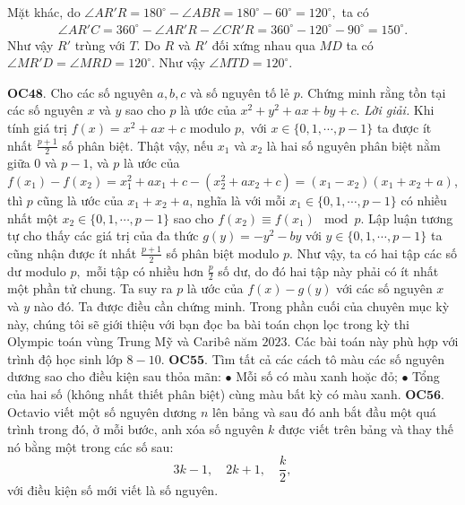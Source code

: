 \begin{multicols}
{	\vskip 0.1cm
	Mặt khác, do $\angle AR'R=180^\circ - \angle ABR= 180^\circ-60^\circ=120^\circ,$ ta có 
	\begin{align*}
		\angle AR'C=360^\circ-\angle AR'R - \angle CR'R = 360^\circ -120^\circ - 90^\circ=150^\circ.
	\end{align*}
	Như vậy $R'$ trùng với $T.$ Do $R$ và $R'$ đối xứng nhau qua $MD$ ta có $\angle MR'D=\angle MRD= 120^\circ.$  Như vậy $\angle MTD=120^\circ.$  
	
	
	{\bf\color{cackithi} OC$\pmb{48.}$} Cho các số nguyên $a, b, c$ và số nguyên tố lẻ $p.$ Chứng minh rằng tồn tại các số nguyên $x$ và $y$ sao cho $p$ là ước của $x^2 + y^2 + ax + by + c.$      
	\vskip 0.1cm
	\textit{Lời giải.}
	Khi tính giá trị  $f(x)=x^2+ax+c$ modulo $p,$ với $x \in \{0, 1, \cdots, p - 1\}$ ta được ít nhất $\frac{p+1}{2}$  số phân biệt. Thật vậy, nếu $x_1$ và $x_2$ là hai số nguyên phân biệt nằm giữa $0$ và $p-1$, và $p$ là ước của  $f(x_1)-f(x_2) = x_1^2 +ax_1+c-(x_2^2 +ax_2+c) = (x_1-x_2)(x_1+x_2+a)$,
	thì $p$ cũng là ước của $x_1 + x_2 + a$, nghĩa là với mỗi $x_1\in \{0, 1, \cdots, p - 1\}$ có nhiều nhất
	một $x_2\in \{0, 1, \cdots, p - 1\}$  sao cho $f(x_2)\equiv f(x_1) \mod p.$ 
	\vskip 0.1cm
	Lập luận tương tự cho thấy các giá trị của đa thức $g(y) = -y^2 - by$ với  $y \in \{0, 1, \cdots, p - 1\}$ ta cũng nhận được ít nhất $\frac{p+1}{2}$ số phân biệt modulo $p.$ Như vậy, ta có hai tập các số dư modulo $p,$  mỗi tập có nhiều hơn $\frac{p}{2}$ số dư, do đó hai tập này phải có ít nhất một phần tử chung. Ta suy ra $p$ là ước của $f(x) - g(y)$ với các số nguyên $x$ và $y$ nào đó. Ta được điều cần chứng minh.  
	\vskip 0.1cm
	Trong phần cuối của chuyên mục kỳ này, chúng tôi sẽ giới thiệu với bạn đọc ba bài toán chọn lọc trong kỳ thi Olympic toán vùng Trung Mỹ và Caribê năm $2023$. Các bài toán này phù hợp với trình độ học sinh lớp $8-10$.
	\vskip 0.1cm
	{\bf\color{cackithi} OC$\pmb{55.}$} Tìm tất cả các cách tô màu các số nguyên dương sao cho điều kiện sau thỏa mãn:  
	\vskip 0.1cm
	$\bullet$ Mỗi số có màu xanh hoặc đỏ;
	\vskip 0.1cm
	$\bullet$ Tổng của hai số (không nhất thiết phân biệt) cùng màu bất kỳ  có màu xanh.
	\vskip 0.1cm
	{\bf\color{cackithi} OC$\pmb{56.}$} Octavio viết một số nguyên dương $n$ lên bảng  và sau đó anh bắt đầu một quá trình trong đó, ở mỗi bước, anh xóa số nguyên $k$ được viết trên bảng  và thay thế nó bằng một trong các số sau:
	$$3k-1, \quad 2k+1, \quad \frac{k}{2},$$ với điều kiện số mới viết là số nguyên.
}
\end{multicols}
